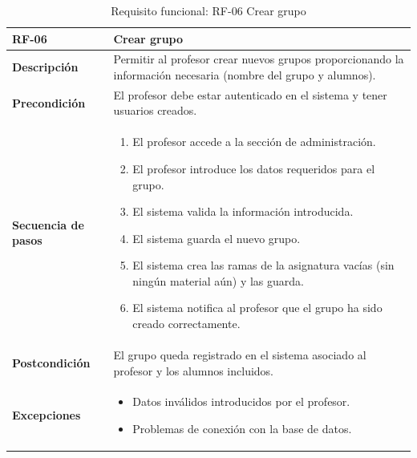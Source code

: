 \begin{table}[H]
\centering
\begin{tabularx}{\textwidth}{
  |>{\centering\arraybackslash}l
  |>{\centering\arraybackslash}X|}
\hline
\textbf{RF-06} & \textbf{Crear grupo} \\ \hline

\textbf{Descripción} & Permitir al profesor crear nuevos grupos proporcionando la información necesaria (nombre del grupo y alumnos). \\ \hline

\textbf{Precondición} & El profesor debe estar autenticado en el sistema y tener usuarios creados. \\ \hline

\textbf{Secuencia de pasos} & 
\begin{enumerate}
  \item El profesor accede a la sección de administración.
  \item El profesor introduce los datos requeridos para el grupo.
  \item El sistema valida la información introducida.
  \item El sistema guarda el nuevo grupo.
  \item El sistema crea las ramas de la asignatura vacías (sin ningún material aún) y las guarda.
  \item El sistema notifica al profesor que el grupo ha sido creado correctamente.
\end{enumerate} \\ \hline

\textbf{Postcondición} & El grupo queda registrado en el sistema asociado al profesor y los alumnos incluidos. \\ \hline

\textbf{Excepciones} & 
\begin{itemize}
  \item Datos inválidos introducidos por el profesor.
  \item Problemas de conexión con la base de datos.
\end{itemize} \\ \hline
\end{tabularx}
\caption{Requisito funcional: RF-06 Crear grupo}
\end{table}


